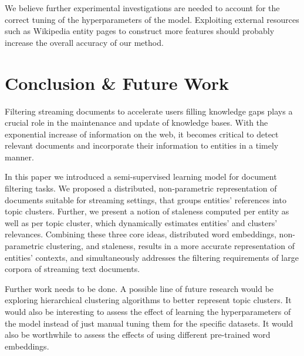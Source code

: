 \documentclass{article}
\begin{document}

We believe further experimental investigations are needed to account for the correct tuning of the hyperparameters of the model. Exploiting external resources such as Wikipedia entity pages to construct more features \cite{xitong12} should probably increase the overall accuracy of our method. 

\section{Conclusion \& Future Work}
\label{conclusion}

Filtering streaming documents to accelerate users filling knowledge gaps plays a crucial role in the maintenance and update of knowledge bases.
With the exponential increase of information on the web, it becomes critical to detect relevant documents and incorporate their information to entities in a timely manner. %

In this paper we introduced a semi-supervised learning model for document filtering tasks. We proposed a distributed, non-parametric representation of documents suitable for streaming settings, that groups entities' references into topic clusters. Further, we present a notion of staleness computed per entity as well as per topic cluster, which dynamically estimates entities' and clusters' relevances.
Combining these three core ideas, distributed word embeddings, non-parametric clustering, and staleness, results in a more accurate representation of entities' contexts, and simultaneously addresses the filtering requirements of large corpora of streaming text documents.

Further work needs to be done. A possible line of future research would be exploring hierarchical clustering algorithms to better represent topic clusters. It would also be interesting to assess the effect of learning the hyperparameters of the model instead of just manual tuning them for the specific datasets.
It would also be worthwhile to assess the effects of using different pre-trained word embeddings.
\end{document}
